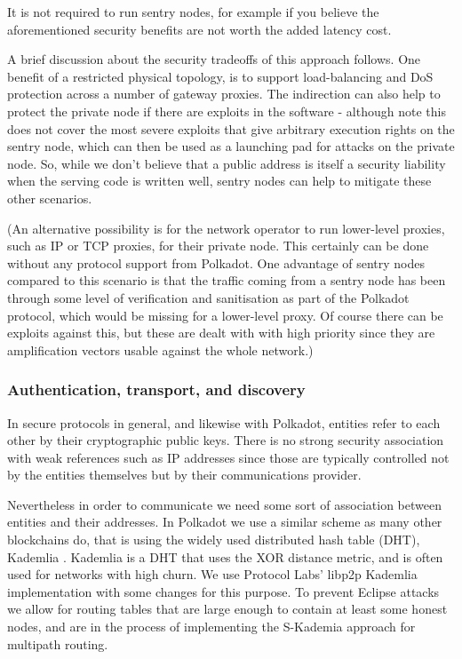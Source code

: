 It is not required to run sentry nodes, for example if you believe the
aforementioned security benefits are not worth the added latency cost.

A brief discussion about the security tradeoffs of this approach follows. One
benefit of a restricted physical topology, is to support load-balancing and DoS
protection across a number of gateway proxies. The indirection can also help to
protect the private node if there are exploits in the software - although note
this does not cover the most severe exploits that give arbitrary execution
rights on the sentry node, which can then be used as a launching pad for
attacks on the private node. So, while we don't believe that a public address
is itself a security liability when the serving code is written well, sentry
nodes can help to mitigate these other scenarios.

(An alternative possibility is for the network operator to run lower-level
proxies, such as IP or TCP proxies, for their private node. This certainly can
be done without any protocol support from Polkadot. One advantage of sentry
nodes compared to this scenario is that the traffic coming from a sentry node
has been through some level of verification and sanitisation as part of the
Polkadot protocol, which would be missing for a lower-level proxy. Of course
there can be exploits against this, but these are dealt with with high priority
since they are amplification vectors usable against the whole network.)

\subsubsection{Authentication, transport, and discovery} \label{sec:net_lowlevel}

In secure protocols in general, and likewise with Polkadot, entities refer to each other by their cryptographic public keys. There is no strong security association with weak references such as IP addresses since those are typically controlled not by the entities themselves but by their communications provider.

Nevertheless in order to communicate we need some sort of association between entities and their addresses. In Polkadot we use a similar scheme as many other blockchains do, that is using the widely used distributed hash table (DHT), Kademlia \cite{Maymounkov:2002:Kademila}. Kademlia is a DHT that uses the XOR distance metric, and is often used for networks with high churn. We use Protocol Labs' libp2p Kademlia implementation with some changes for this purpose. To prevent Eclipse attacks \cite{eclipseattack} we allow for routing tables that are large enough to contain at least some honest nodes, and are in the process of implementing the S-Kademia approach for multipath routing.

